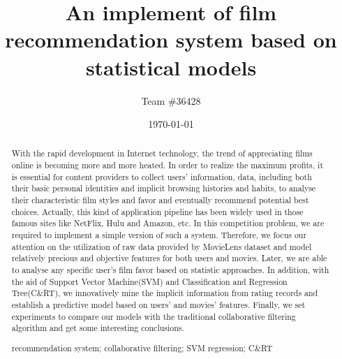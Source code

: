\documentclass[a4paper,11pt]{article}
\title{An implement of film recommendation system based on statistical models}
\author{Team \#36428}
\date{\today}
\begin{document}
   
\begin{abstract}
  With the rapid development in Internet technology, the trend of appreciating films online is becoming more and more heated. In order to realize the maximum profits, it is essential for content providers to collect users' information, data, including both their basic personal identities and implicit browsing histories and habits, to analyse their characteristic film styles and favor and eventually recommend potential best choices. Actually, this kind of application pipeline has been widely used in those famous sites like NetFlix\cite{bennett2007netflix}, Hulu\cite{zheng2010clicks} and Amazon\cite{linden2003amazon}, etc. 
  In this competition problem, we are required to implement a simple version of such a system. Therefore, we focus our attention on the utilization of raw data provided by MovieLens dataset \cite{miller2003movielens} and model relatively precious and objective features for both users and movies. Later, we are able to analyse any specific user's film favor based on statistic approaches. In addition, with the aid of Support Vector Machine(SVM)\cite{suykens1999least} and Classification and Regression Tree(C\&RT)\cite{lewis2000introduction}, we innovatively mine the implicit information from rating records and establish a predictive model based on users' and movies' features. Finally, we set experiments to compare our models with the traditional collaborative filtering algorithm\cite{breese1998empirical} and get some interesting conclusions. 
  
\begin{keywords}
recommendation system; collaborative filtering; SVM regression; C\&RT
\end{keywords}
\end{abstract}

\maketitle
\pagestyle{empty}
%
\newpage                                                          %


\tableofcontents                                                  %
\newpage
\pagestyle{fancy}                                                     %



\end{document}
